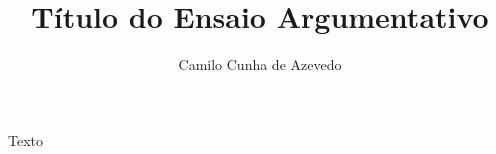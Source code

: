 \documentclass[a4paper, 12pt]{article}
\title{Título do Ensaio Argumentativo}
\author{Camilo Cunha de Azevedo}
\date{}
\begin{document}
\maketitle

Texto
\end{document}
